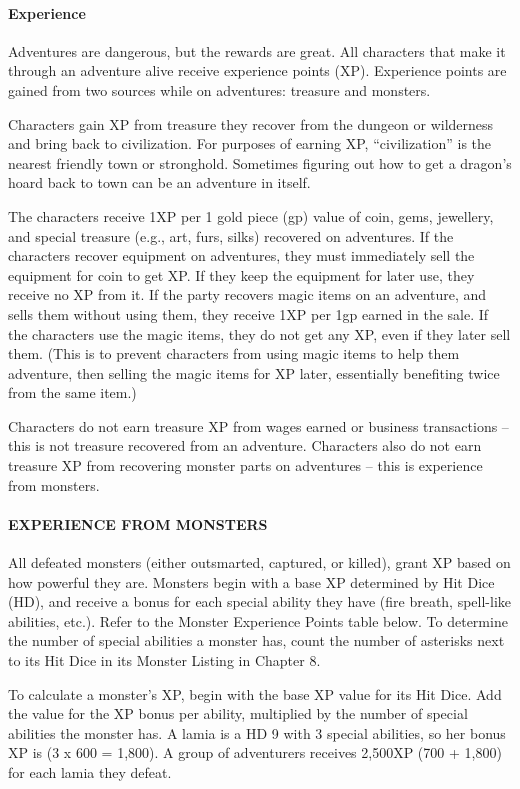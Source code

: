 \paragraph{Experience}
Adventures are dangerous, but the rewards are great. All characters that make it through an adventure alive receive experience points (XP). Experience points are gained from two sources while on adventures: treasure and monsters. 

Characters gain XP from treasure they recover from the dungeon or wilderness and bring back to civilization. For purposes of earning XP, “civilization” is the nearest friendly town or stronghold. Sometimes figuring out how to get a dragon’s hoard back to town can be an adventure in itself. 

The characters receive 1XP per 1 gold piece (gp) value of coin, gems, jewellery, and special treasure (e.g., art, furs, silks) recovered on adventures. If the characters recover equipment on adventures, they must immediately sell the equipment for coin to get XP. If they keep the equipment for later use, they receive no XP from it. If the party recovers magic items on an adventure, and sells them without using them, they receive 1XP per 1gp earned in the sale. If the characters use the magic items, they do not get any XP, even if they later sell them. (This is to prevent characters from using magic items to help them adventure, then selling the magic items for XP later, essentially benefiting twice from the same item.) 

Characters do not earn treasure XP from wages earned or business transactions – this is not treasure recovered from an adventure. Characters also do not earn treasure XP from recovering monster parts on adventures – this is experience from monsters. 

\paragraph{EXPERIENCE FROM MONSTERS}

All defeated monsters (either outsmarted, captured, or killed), grant XP based on how powerful they are. Monsters begin with a base XP determined by Hit Dice (HD), and receive a bonus for each special ability they have (fire breath, spell-like abilities, etc.). Refer to the Monster Experience Points table below. To determine the number of special abilities a monster has, count the number of asterisks next to its Hit Dice in its Monster Listing in Chapter 8. 

To calculate a monster’s XP, begin with the base XP value for its Hit Dice. Add the value for the XP bonus per ability, multiplied by the number of special abilities the monster has. A lamia is a HD 9 with 3 special abilities, so her bonus XP is (3 x 600 = 1,800). A group of adventurers receives 2,500XP (700 + 1,800) for each lamia they defeat. 
\newline
